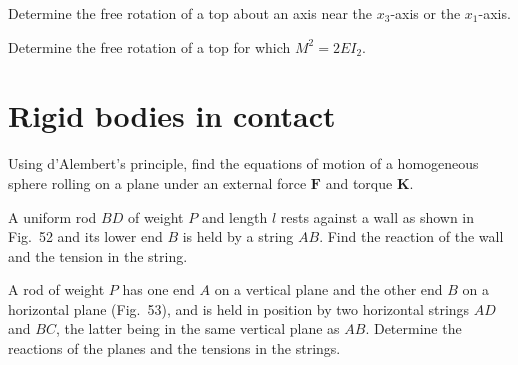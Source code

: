 
\begin{problem}[title={Free rotation of a top near a principal axis}]
{
Determine the free rotation of a top about an axis near the $x_3$-axis or the $x_1$-axis.
}
{}
{}
\end{problem}


\begin{problem}[title={Free asymmetrical top with \texorplain{$M^2 = 2EI_2$}{M² = 2EI₂}}]
{
Determine the free rotation of a top for which $M^2 = 2EI_2$.
}
{}
{}
\end{problem}

\section{Rigid bodies in contact}


\begin{problem}[title={Rolling sphere by d'Alembert's principle}]
{
Using d'Alembert's principle, find the equations of motion of a homogeneous sphere rolling on a plane under an external force $\mathbf{F}$ and torque $\mathbf{K}$.
}
{}
{}
\end{problem}


\begin{problem}[title={Rod against a wall held by a string}]
{
A uniform rod $BD$ of weight $P$ and length $l$ rests against a wall as shown in Fig.~52 and its lower end $B$ is held by a string $AB$. Find the reaction of the wall and the tension in the string.
}
{}
{}
\end{problem}


\begin{problem}[title={Rod between two planes held by two strings}]
{
A rod of weight $P$ has one end $A$ on a vertical plane and the other end $B$ on a horizontal plane (Fig.~53), and is held in position by two horizontal strings $AD$ and $BC$, the latter being in the same vertical plane as $AB$. Determine the reactions of the planes and the tensions in the strings.
}
{}
{}
\end{problem}


